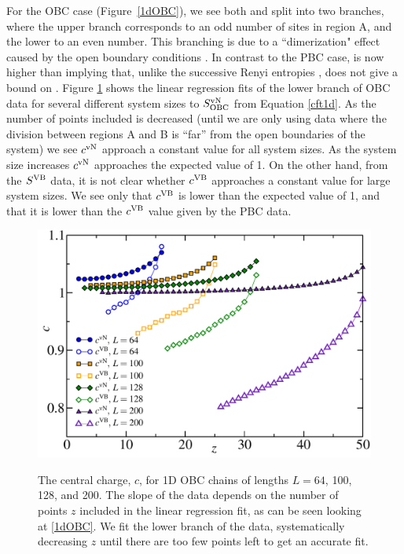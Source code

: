 For the OBC case (Figure~\ref{1dOBC}), we see both \vn and \vb split into two branches, where the upper branch corresponds to an odd number of sites in region A, and the lower to an even number.
This branching is due to a ``dimerization" effect caused by the open boundary conditions \cite{Ian1}.
In contrast to the PBC case, \vb is now higher than \vN{} implying that, unlike the successive Renyi entropies , \vb does not give a bound on \vn.
Figure \ref{c2} shows the linear regression fits of the lower branch of OBC data for several different system sizes to $S^{\text{vN}}_{\text{OBC}}$ from Equation \eqref{cft1d}.  As the number of points included is decreased (until we are only using data where the division between regions A and B is ``far'' from the open boundaries of the system) we see $c^{\rm vN}$ approach a constant value for all system sizes.  As the system size increases $c^{\rm vN}$ approaches the expected value  of 1.  On the other hand, from the $S^{\rm VB}$ data, it is not clear whether $c^{\rm VB}$ approaches a constant value for large system sizes.  We see only that $c^{\rm VB}$ is lower than the expected value of 1, and that it is lower than the $c^{\rm VB}$ value given by the PBC data.


\begin{figure} {
\includegraphics[width=6in]{./figures/paper1/figure1/newfig2.pdf} 
\centering
\label{c2}
\caption[Central charge for 1D OBC chains]{ The central charge, $c$, for 1D OBC chains of lengths $L=64$, 100, 128, and 200.
The slope of the data depends on the number of points $z$ included in the linear regression fit, as can be seen looking at \ref{1dOBC}.
We fit the lower branch of the data, systematically decreasing $z$ until there are too few points left to get an accurate fit.
}}
\end{figure}


